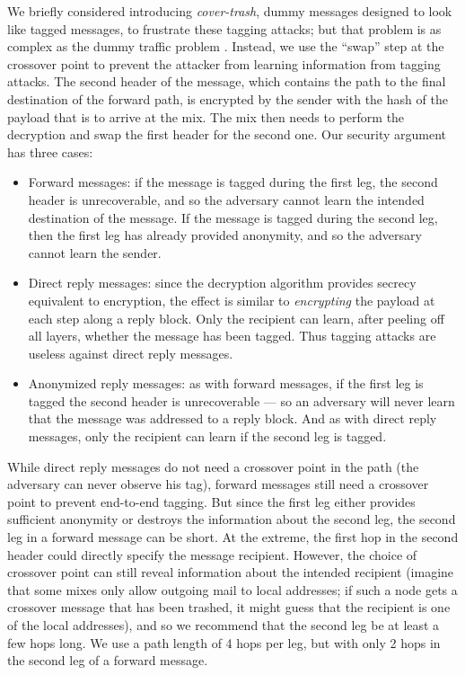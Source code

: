 \documentclass[times,10pt,twocolumn]{article}
\begin{document}
We briefly considered introducing \emph{cover-trash}, dummy messages
designed to look like tagged messages, to frustrate
these tagging attacks; but that problem is as complex as the dummy
traffic problem \cite{langos02}. Instead, we use the
``swap'' step at the
crossover point to prevent the attacker from learning information from
tagging attacks. The second header of the message, which contains the
path to the final destination of the forward path, is encrypted by the
sender with the hash of the payload that is to arrive at the mix. The
mix then needs to perform the decryption and swap the first header for
the second one.
Our security argument has three cases:

\begin{itemize}
\item Forward messages: if the message is tagged during the first leg,
the second header is unrecoverable, and so the adversary cannot
learn the intended destination of the message. If the message is tagged
during the second leg, then the first leg has already provided anonymity,
and so the adversary cannot learn the sender.
\item Direct reply messages: since the decryption algorithm provides
secrecy equivalent to encryption, the effect is similar to {\em encrypting}
the payload at each step along a reply block. Only the recipient can learn,
after peeling off all layers, whether the message has been tagged. Thus
tagging attacks are useless against direct reply messages.
\item Anonymized reply messages: as with forward messages, if the first leg
is tagged the second header is unrecoverable --- so an adversary will
never learn that the message was addressed to a reply block. And as with
direct reply messages, only the recipient can learn if the second leg is
tagged.
\end{itemize}

While direct reply messages do not need a crossover point in the path
(the adversary can never observe his tag), forward messages still need a
crossover point to prevent end-to-end tagging. But since the first leg
either provides sufficient anonymity or destroys the information about
the second leg, the second leg in a forward message can be short.
At the extreme, the first hop in the second header could directly
specify the message recipient. However, the choice of crossover point
can still reveal information about the intended recipient (imagine that
some mixes only allow outgoing mail to local addresses; if such a
node gets a crossover message that has been trashed, it might guess
that the recipient is one of the local addresses), and so we recommend
that the second leg be at least a few hops long.
We use a path length of 4 hops per leg, but with only 2 hops in the
second leg of a forward message.
\end{document}
